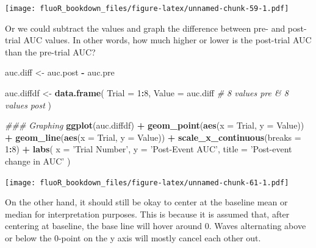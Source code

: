 \documentclass[
]{book}
\newenvironment{Shaded}{\begin{snugshade}}{\end{snugshade}}
\newcommand{\CommentTok}[1]{\textcolor[rgb]{0.56,0.35,0.01}{\textit{#1}}}
\newcommand{\DataTypeTok}[1]{\textcolor[rgb]{0.13,0.29,0.53}{#1}}
\newcommand{\DecValTok}[1]{\textcolor[rgb]{0.00,0.00,0.81}{#1}}
\newcommand{\KeywordTok}[1]{\textcolor[rgb]{0.13,0.29,0.53}{\textbf{#1}}}
\newcommand{\NormalTok}[1]{#1}
\newcommand{\OperatorTok}[1]{\textcolor[rgb]{0.81,0.36,0.00}{\textbf{#1}}}
\newcommand{\StringTok}[1]{\textcolor[rgb]{0.31,0.60,0.02}{#1}}
\begin{document}
\texttt{[image: fluoR\_bookdown\_files/figure-latex/unnamed-chunk-59-1.pdf]}

Or we could subtract the values and graph the difference between pre- and post- trial AUC values. In other words, how much higher or lower is the post-trial AUC than the pre-trial AUC?

\begin{Shaded}
\begin{Highlighting}[]
\NormalTok{auc.diff <-}\StringTok{ }\NormalTok{auc.post }\OperatorTok{-}\StringTok{ }\NormalTok{auc.pre}

\NormalTok{auc.diffdf <-}\StringTok{ }\KeywordTok{data.frame}\NormalTok{(}
  \DataTypeTok{Trial =} \DecValTok{1}\OperatorTok{:}\DecValTok{8}\NormalTok{,}
  \DataTypeTok{Value =}\NormalTok{ auc.diff }\CommentTok{# 8 values pre & 8 values post}
\NormalTok{)}
\end{Highlighting}
\end{Shaded}

\begin{Shaded}
\begin{Highlighting}[]
\CommentTok{### Graphing}
\KeywordTok{ggplot}\NormalTok{(auc.diffdf) }\OperatorTok{+}
\StringTok{  }\KeywordTok{geom_point}\NormalTok{(}\KeywordTok{aes}\NormalTok{(}\DataTypeTok{x =}\NormalTok{ Trial, }\DataTypeTok{y =}\NormalTok{ Value)) }\OperatorTok{+}
\StringTok{  }\KeywordTok{geom_line}\NormalTok{(}\KeywordTok{aes}\NormalTok{(}\DataTypeTok{x =}\NormalTok{ Trial, }\DataTypeTok{y =}\NormalTok{ Value)) }\OperatorTok{+}
\StringTok{  }\KeywordTok{scale_x_continuous}\NormalTok{(}\DataTypeTok{breaks =} \DecValTok{1}\OperatorTok{:}\DecValTok{8}\NormalTok{) }\OperatorTok{+}
\StringTok{  }\KeywordTok{labs}\NormalTok{(}
    \DataTypeTok{x =} \StringTok{'Trial Number'}\NormalTok{,}
    \DataTypeTok{y =} \StringTok{'Post-Event AUC'}\NormalTok{,}
    \DataTypeTok{title =} \StringTok{'Post-event change in AUC'}
\NormalTok{  )}
\end{Highlighting}
\end{Shaded}

\texttt{[image: fluoR\_bookdown\_files/figure-latex/unnamed-chunk-61-1.pdf]}

On the other hand, it should still be okay to center at the baseline mean or median for interpretation purposes. This is because it is assumed that, after centering at baseline, the base line will hover around 0. Waves alternating above or below the 0-point on the y axis will mostly cancel each other out.

  
\end{document}
